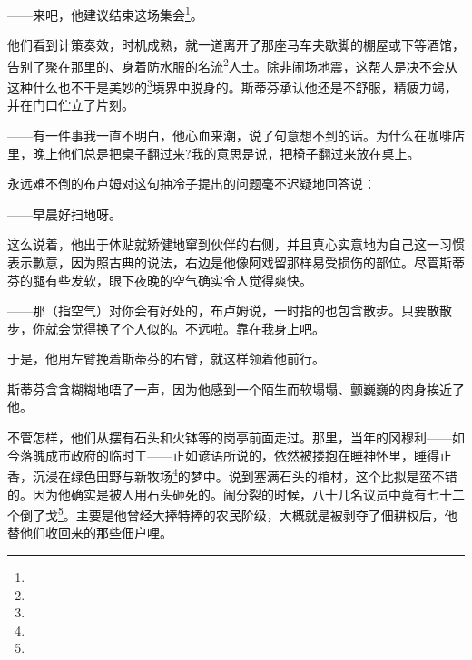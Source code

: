 \par ——来吧，他建议结束这场集会\footnote{}。
\par 他们看到计策奏效，时机成熟，就一道离开了那座马车夫歇脚的棚屋或下等酒馆，告别了聚在那里的、身着防水服的名流\footnote{}人士。除非闹场地震，这帮人是决不会从这种什么也不干是美妙的\footnote{}境界中脱身的。斯蒂芬承认他还是不舒服，精疲力竭，并在门口伫立了片刻。
\par ——有一件事我一直不明白，他心血来潮，说了句意想不到的话。为什么在咖啡店里，晚上他们总是把桌子翻过来?我的意思是说，把椅子翻过来放在桌上。
\par 永远难不倒的布卢姆对这句抽冷子提出的问题毫不迟疑地回答说：
\par ——早晨好扫地呀。
\par 这么说着，他出于体贴就矫健地窜到伙伴的右侧，并且真心实意地为自己这一习惯表示歉意，因为照古典的说法，右边是他像阿戏留那样易受损伤的部位。尽管斯蒂芬的腿有些发软，眼下夜晚的空气确实令人觉得爽快。
\par ——那（指空气）对你会有好处的，布卢姆说，一时指的也包含散步。只要散散步，你就会觉得换了个人似的。不远啦。靠在我身上吧。
\par 于是，他用左臂挽着斯蒂芬的右臂，就这样领着他前行。
\par 斯蒂芬含含糊糊地唔了一声，因为他感到一个陌生而软塌塌、颤巍巍的肉身挨近了他。
\par 不管怎样，他们从摆有石头和火钵等的岗亭前面走过。那里，当年的冈穆利——如今落魄成市政府的临时工——正如谚语所说的，依然被搂抱在睡神怀里，睡得正香，沉浸在绿色田野与新牧场\footnote{}的梦中。说到塞满石头的棺材，这个比拟是蛮不错的。因为他确实是被人用石头砸死的。闹分裂的时候，八十几名议员中竟有七十二个倒了戈\footnote{}。主要是他曾经大捧特捧的农民阶级，大概就是被剥夺了佃耕权后，他替他们收回来的那些佃户哩。
